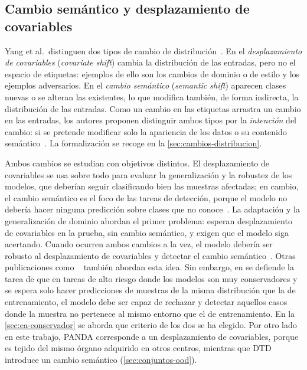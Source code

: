 \subsection{Cambio semántico y desplazamiento de covariables}\label{sec:ea-shift}

Yang et al.\ distinguen dos tipos de cambio de distribución~\cite{yang2024}. En
el \emph{desplazamiento de covariables} (\textit{covariate shift}) cambia la distribución de las entradas,
pero no el espacio de etiquetas: ejemplos de ello son los cambios de dominio o de
estilo y los ejemplos adversarios. En el \emph{cambio semántico} (\textit{semantic shift}) aparecen clases
nuevas o se alteran las existentes, lo que modifica también, de forma indirecta,
la distribución de las entradas. Como un cambio en las etiquetas arrastra un
cambio en las entradas, los autores proponen distinguir ambos tipos por la
\emph{intención} del cambio: si se pretende modificar solo la apariencia de los
datos o su contenido semántico~\cite{yang2024}. La formalización se recoge en la
\cref{sec:cambios-distribucion}.

Ambos cambios se estudian con objetivos distintos. El desplazamiento de
covariables se usa sobre todo para evaluar la generalización y la robustez de los
modelos, que deberían seguir clasificando bien las muestras afectadas; en cambio,
el cambio semántico es el foco de las tareas de detección, porque el modelo no
debería hacer ninguna predicción sobre clases que no conoce~\cite{yang2024}. La
adaptación y la generalización de dominio abordan el primer problema: esperan
desplazamiento de covariables en la prueba, sin cambio semántico, y exigen que el
modelo siga acertando. Cuando ocurren ambos cambios a la vez, el modelo debería
ser robusto al desplazamiento de covariables y detectar el cambio
semántico~\cite{yang2024}. Otras publicaciones como ~\cite{openood15} también abordan esta idea. Sin embargo, en \cite{zimmerer2022}
se defiende la tarea de que en tareas de alto riesgo donde los modelos son muy conservadores y se espera
solo hacer predicciones de muestras de la misma distribución que la de entrenamiento, el modelo debe ser capaz de rechazar 
y detectar aquellos casos donde la muestra no pertenece al mismo entorno que el de entrenamiento. En la \cref{sec:ea-conservador} se aborda que criterio de los dos se ha elegido.  Por otro lado en este trabajo, PANDA corresponde a un desplazamiento
de covariables, porque es tejido del mismo órgano adquirido en otros centros,
mientras que DTD introduce un cambio semántico (\cref{sec:conjuntos-ood}).

